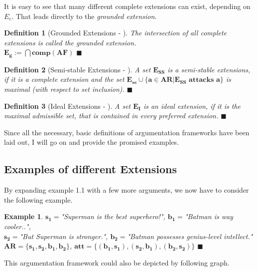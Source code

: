 \documentclass[12pt]{report}
\numberwithin{figure}{chapter}
\theoremstyle{break}
\newtheorem{defn}{Definition}[chapter]
\newtheorem{exmpl}{Example}[chapter]
\newenvironment{mydefn}{\begin{defn}}{$\blacksquare$ \end{defn}}
\newenvironment{myexmpl}{\begin{exmpl}}{$\blacksquare$ \end{exmpl}}
\begin{document}
It is easy to see that many different complete extensions can exist, depending on $E_{c}$. That leads directly to the \textit{grounded extension}.

\begin{mydefn}[Grounded Extensions - \cite{Egly}]
The intersection of all complete extensions is called the grounded extension.\\ $\bm{E_{g} := \bigcap{comp(AF)}}$
\label{ground ext}
\end{mydefn}

\begin{mydefn}[Semi-stable Extensions - \cite{Caminada}]
A set $\bm{E_{SS}}$ is a semi-stable extensions, if it is a complete extension and the set $\bm{E_{ss} \cup \{a \in AR \vert E_{SS} \text{ attacks }a\}}$
is maximal (with respect to set inclusion).
\label{semi ext}
\end{mydefn}

\begin{mydefn}[Ideal Extensions - \cite{Dung2}]
A set $\bm{E_{I}}$ is an ideal extension, if it is the maximal admissible set, that is contained in every preferred extension.
\label{ideal ext}
\end{mydefn}

Since all the necessary, basic definitions of argumentation frameworks have been laid out, I will go on and provide the promised examples.

\newpage

\subsection{Examples of different Extensions}
By expanding example 1.1 with a few more arguments, we now have to consider the following example.

\begin{myexmpl}
$\bm{s_{1}=}$"Superman is the best superhero!", $\bm{b_{1}=}$"Batman is way cooler..",\\
$\bm{s_{2}=}$"But Superman is stronger.", $\bm{b_{2}=}$"Batman possesses genius-level intellect."\\
$\bm{AR = \{s_{1},s_{2},b_{1},b_{2}\}}$, $\bm{att = \{(b_{1},s_{1}),(s_{2},b_{1}),(b_{2},s_{2})\}}$
\label{s1 s2 b1 b2 ex}
\end{myexmpl}

This argumentation framework could also be depicted by following graph.
\end{document}
